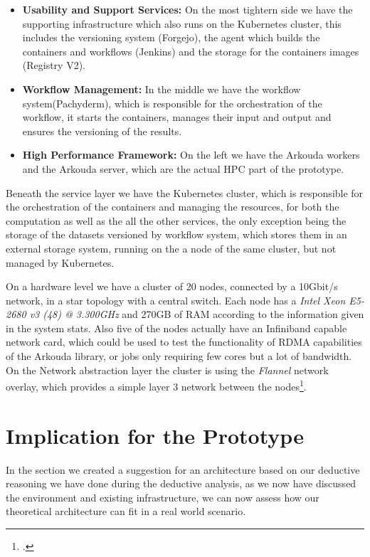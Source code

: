 \begin{itemize}
    \item \textbf{Usability and Support Services:}  On the most tightern side we have the supporting infrastructure which also runs on the Kubernetes cluster,
          this includes the versioning system (Forgejo), the agent which builds the containers and workflows (Jenkins)
          and the storage for the containers images (Registry V2).
    \item \textbf{Workflow Management:} In the middle we have the workflow system(Pachyderm), which is responsible for the orchestration of the workflow,
          it starts the containers, manages their input and output and ensures the versioning of the results.
    \item \textbf{High Performance Framework:} On the left we have the Arkouda workers and the Arkouda server, which are the actual \ac{HPC} part of the prototype.
\end{itemize}

Beneath the service layer we have the Kubernetes cluster, which is responsible for the orchestration of the containers and managing the resources,
for both the computation as well as the all the other services, the only exception being the storage of the datasets versioned by
workflow system, which stores them in an external storage system, running on the a node of the same cluster, but not managed by Kubernetes.

On a hardware level we have a cluster of 20 nodes, connected by a 10Gbit/s network, in a star topology with a central switch.
Each node has a \textit{Intel Xeon E5-2680 v3 (48) @ 3.300GHz} and 270GB of RAM according to the information given in
the system stats. Also five of the nodes actually have an Infiniband capable network card, which could be used to test
the functionality of \ac{RDMA} capabilities of the Arkouda library, or jobs only requiring few cores but a lot of bandwidth.
On the Network abstraction layer the cluster is using the \textit{Flannel} network overlay, which provides a simple
layer 3 network between the nodes\footcite{flannelFlannelioFlannel2024}.


\section{Implication for the Prototype}
\label{sec:implications_for_prototype}
In the section  we created a suggestion for an architecture based on
our deductive reasoning we have done during the deductive analysis, as we now have discussed the environment
and existing infrastructure, we can now assess how our theoretical architecture can fit in a real world scenario.

